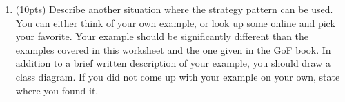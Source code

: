 \documentclass[11pt]{article}
\newlength{\up}\setlength{\up}{-\baselineskip}
\begin{document}
\begin{enumerate}
\begin{enumerate}
  \end{enumerate}

\newpage

\item (10pts) Describe another situation where the strategy pattern can be used. You can either think of your own example, or look up some online and pick your favorite. Your example should be significantly different than the examples covered in this worksheet and the one given in the GoF book. In addition to a brief written description of your example, you should draw a class diagram. If you did not come up with your example on your own, state where you found it.

\vfill


\end{enumerate}
\end{document}
